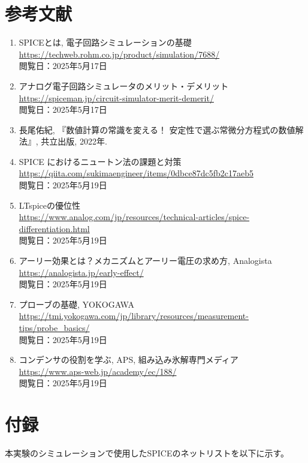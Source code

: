 \documentclass{jlreq}
\numberwithin{equation}{section}
\begin{document}
\section{参考文献}
\begin{enumerate}
  \item SPICEとは, 電子回路シミュレーションの基礎 \\
    \url{https://techweb.rohm.co.jp/product/simulation/7688/}\\
    閲覧日：2025年5月17日
  \item アナログ電子回路シミュレータのメリット・デメリット \\
    \url{https://spiceman.jp/circuit-simulator-merit-demerit/}\\
    閲覧日：2025年5月17日
  \item 長尾佑紀, 『数値計算の常識を変える！ 安定性で選ぶ常微分方程式の数値解法』, 共立出版, 2022年.
  \item SPICE におけるニュートン法の課題と対策\\
  \url{https://qiita.com/sukimaengineer/items/0dbce87dc5fb2c17aeb5} \\
  閲覧日：2025年5月19日
   \item LTspiceの優位性\\
  \url{https://www.analog.com/jp/resources/technical-articles/spice-differentiation.html} \\
  閲覧日：2025年5月19日
  \item アーリー効果とは？メカニズムとアーリー電圧の求め方, Analogista \\
  \url{https://analogista.jp/early-effect/} \\
  閲覧日：2025年5月19日
  \item プローブの基礎, YOKOGAWA \\
  \url{https://tmi.yokogawa.com/jp/library/resources/measurement-tips/probe_basics/} \\
  閲覧日：2025年5月19日
  \item コンデンサの役割を学ぶ, APS, 組み込み氷解専門メディア \\
  \url{https://www.aps-web.jp/academy/ec/188/} \\
  閲覧日：2025年5月19日
\end{enumerate}

\section{付録}
本実験のシミュレーションで使用したSPICEのネットリストを以下に示す。
\end{document}
